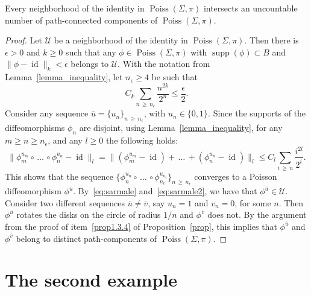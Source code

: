 \documentclass[AHL,Unicode,published]{cedram}
\newcommand{\norm}[1]{\|#1\|}
\newcommand{\clU}{\mathcal{U}}
\DeclareMathOperator{\Poiss}{Poiss}
\DeclareMathOperator{\id}{id}
\DeclareMathOperator{\supp}{supp}
\begin{document}
\begin{coro}\label{coro}
Every neighborhood of the identity in $\Poiss(\Sigma,\pi)$ intersects an uncountable number of path-connected components of $\Poiss(\Sigma,\pi)$.
\end{coro}


\begin{proof}
Let $\clU$ be a neighborhood of the identity in $\Poiss(\Sigma,\pi)$. Then there is $\epsilon>0$ and $k\geq 0$ such that any $\phi\in \Poiss(\Sigma,\pi)$ with $\supp(\phi)\subset B$ and $\norm{\phi-\id}_k<\epsilon$ belongs to $\clU$. With the notation from Lemma~\ref{lemma_inequality}, let $n_{\epsilon}\geq 4$ be such that
\begin{equation}\label{eq:sarmale}
C_k\sum_{n\,\geq\,n_{\epsilon}}\frac{n^{2k}}{2^n}\leq \frac{\epsilon}{2}.
\end{equation}
Consider any sequence $\overline{u}=\{u_n\}_{n\,\geq\,n_{\epsilon}}$, with $u_n\in \{0,1\}$. Since the supports of the diffeomorphisms $\phi_n$ are disjoint, using Lemma~\ref{lemma_inequality}, for any $m\geq n\geq n_{\epsilon}$, and any $l\geq 0$ the following holds:
\begin{equation}\label{eq:sarmale2}
\norm{\phi^{u_{m}}_{m}\circ\,\ldots\,\circ
\phi^{u_{n}}_{n}-\id }_l=\norm{\left(\phi^{u_{m}}_{m}-\id\right)+\,\ldots\,+\left(\phi^{u_{n}}_{n}-\id\right)}_l\leq C_l\sum_{i\,\geq\,n}\frac{i^{2l}}{2^i}.
\end{equation}
This shows that the sequence $\{\phi^{u_{n}}_{n}\circ\,\ldots\,\circ\phi^{u_{n_{\epsilon}}}_{n_{\epsilon}}\}_{n\,\geq \,n_{\epsilon}}$ converges to a Poisson diffeomorphism $\phi^{\overline{u}}$. By~\eqref{eq:sarmale} and~\eqref{eq:sarmale2}, we have that $\phi^{\overline{u}}\in \clU$. Consider two different sequences $\overline{u}\neq \overline{v}$, say $u_n=1$ and $v_n=0$, for some $n$. Then $\phi^{\overline{u}}$ rotates the disks on the circle of radius $1/n$ and $\phi^{\overline{v}}$ does not. By the argument from the proof of item~\eqref{prop1.3.4} of Proposition~\ref{prop}, this implies that $\phi^{\overline{u}}$ and $\phi^{\overline{v}}$ belong to distinct path-components of $\Poiss(\Sigma,\pi)$.
\end{proof}


\section{The second example}
\end{document}
